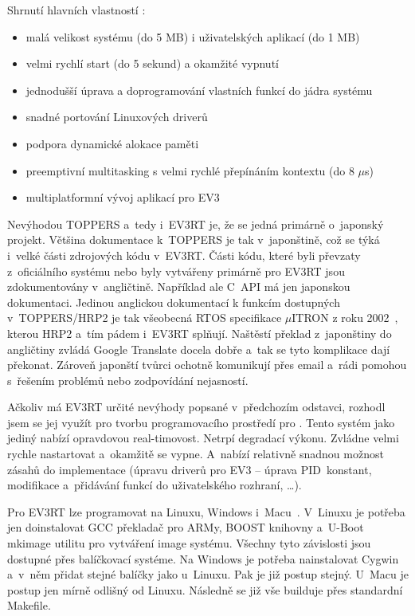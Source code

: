 Shrnutí hlavních vlastností \evRT:

\begin{itemize}
	\item malá velikost systému (do 5 MB) i uživatelských aplikací (do 1 MB)
	\item velmi rychlí start (do 5 sekund) a okamžité vypnutí
	\item jednodušší úprava a doprogramování vlastních funkcí do jádra systému
	\item snadné portování Linuxových driverů
	\item podpora dynamické alokace paměti
	\item preemptivní multitasking s velmi rychlé přepínáním kontextu (do 8 $\mu$s)
	\item multiplatformní vývoj aplikací pro EV3
\end{itemize}
 
Nevýhodou TOPPERS a~tedy i~EV3RT je, že se jedná primárně o~japonský projekt. 
Většina dokumentace k~TOPPERS je tak v~japonštině, což se týká i~velké části zdrojových kódu v~EV3RT. 
Části kódu, které byli převzaty z~oficiálního \lego{} systému nebo byly vytvářeny primárně pro EV3RT jsou zdokumentovány v~angličtině. 
Například ale C~API má jen japonskou dokumentaci.
Jedinou anglickou dokumentací k funkcím dostupných v~TOPPERS/HRP2 je tak všeobecná RTOS specifikace $\mu$ITRON z roku 2002~\cite{legoProgramingPlatform_TOPPERS-IRON}, kterou HRP2 a~tím pádem i~EV3RT splňují. %
Naštěstí překlad z~japonštiny do angličtiny zvládá Google Translate docela dobře a~tak se tyto komplikace dají překonat.
Zároveň japonští tvůrci ochotně komunikují přes email a~rádi pomohou s~řešením problémů nebo zodpovídání nejasností.

Ačkoliv má EV3RT určité nevýhody popsané v~předchozím odstavci, rozhodl jsem se jej využít pro tvorbu programovacího prostředí pro \legoEV{}.
Tento systém jako jediný nabízí opravdovou real-timovost.
Netrpí degradací výkonu.
Zvládne velmi rychle nastartovat a~okamžitě se vypne. 
A~nabízí relativně snadnou možnost zásahů do implementace (úpravu driverů pro EV3 -- úprava PID~konstant, modifikace a~přidávání funkcí do uživatelského rozhraní, \dots). 

Pro EV3RT lze programovat na Linuxu, Windows i~Macu~\cite{legoProgramingPlatform_EV3RT-git-web_get-started}. 
V~Linuxu je potřeba jen doinstalovat GCC překladač pro ARMy, BOOST knihovny a~U-Boot mkimage utilitu pro vytváření image systému. 
Všechny tyto závislosti jsou dostupné přes balíčkovací systéme.
Na Windows je potřeba nainstalovat Cygwin a~v~něm přidat stejné balíčky jako u~Linuxu. Pak je již postup stejný.
U~Macu je postup jen mírně odlišný od Linuxu.
Následně se již vše builduje přes standardní Makefile.


